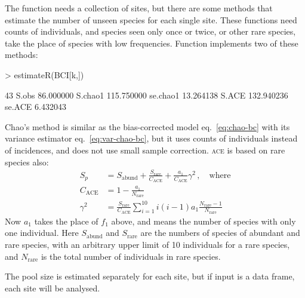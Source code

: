 \documentclass[a4paper,10pt,twocolumn]{article}
\begin{document}
The  function needs a collection of sites, but there
are some methods that estimate the number of unseen species for each
single site.  These functions need counts of individuals, and species
seen only once or twice, or other rare species, take the place of
species with low frequencies.  Function  implements
two of these methods:
\begin{Schunk}
\begin{Sinput}
> estimateR(BCI[k,])
\end{Sinput}
\begin{Soutput}
                 43
S.obs     86.000000
S.chao1  115.750000
se.chao1  13.264138
S.ACE    132.940236
se.ACE     6.432043
\end{Soutput}
\end{Schunk}
Chao's method is similar as the bias-corrected model
eq.~\ref{eq:chao-bc} with its variance estimator
eq.~\ref{eq:var-chao-bc}, but it uses counts of individuals instead of
incidences, and does not use small sample correction.  \textsc{ace} is
based on rare species also:
\begin{equation}
\begin{split}
S_p &= S_\mathrm{abund} + \frac{S_\mathrm{rare}}{C_\mathrm{ACE}} +
\frac{a_1}{C_\mathrm{ACE}} \gamma^2\, , \quad \text{where}\\
C_\mathrm{ACE} &= 1 - \frac{a_1}{N_\mathrm{rare}}\\
\gamma^2 &= \frac{S_\mathrm{rare}}{C_\mathrm{ACE}} \sum_{i=1}^{10} i
(i-1) a_1 \frac{N_\mathrm{rare} - 1}{N_\mathrm{rare}}
\end{split}
\end{equation}
Now $a_1$ takes the place of $f_1$ above, and means the number of
species with only one individual.
Here $S_\mathrm{abund}$ and $S_\mathrm{rare}$ are the numbers of
species of abundant and rare species, with an arbitrary upper limit of
10 individuals for a rare species, and $N_\mathrm{rare}$ is the total
number of individuals in rare species.

The pool size
is estimated separately for each site, but if input is a data frame,
each site will be analysed.
\end{document}

